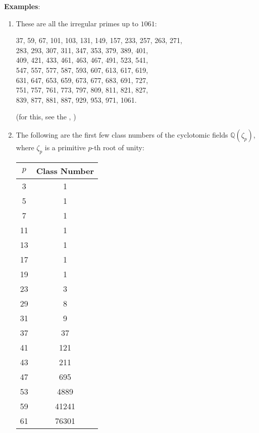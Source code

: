 \documentclass[12pt]{article}
\newcommand{\Rats}{\mathbb{Q}}
\begin{document}
{\bf Examples}:
\begin{enumerate}
\item These are all the irregular primes up to $1061$:

37, 59, 67, 101, 103, 131, 149, 157, 233, 257, 263, 271,\\
283, 293, 307, 311, 347, 353, 379, 389, 401,\\
409, 421, 433, 461, 463, 467, 491, 523, 541,\\
547, 557, 577, 587, 593, 607, 613, 617, 619,\\
631, 647, 653, 659, 673, 677, 683, 691, 727,\\ 
751, 757, 761, 773, 797, 809, 811, 821, 827,\\
839, 877, 881, 887, 929, 953, 971, 1061.

(for this, see the ,  )

\item The following are the first few class numbers of the cyclotomic fields $\Rats(\zeta_p)$, where $\zeta_p$ is a primitive $p$-th root of unity:

\begin{tabular}{|c|c|}
  \hline
  $p$ & Class Number \\
  \hline
  3 & 1 \\
  5 & 1 \\
  7 & 1 \\
  11 & 1 \\
  13 & 1 \\
  17 & 1 \\
  19 & 1 \\
  23 & 3 \\
  29 & 8 \\
  31 & 9 \\
  37 & 37 \\
  41 & 121 \\
  43 & 211 \\
  47 & 695 \\
  53 & 4889 \\
  59 & 41241 \\
  61 & 76301 \\
  \hline
\end{tabular}


\end{enumerate}
\end{document}
